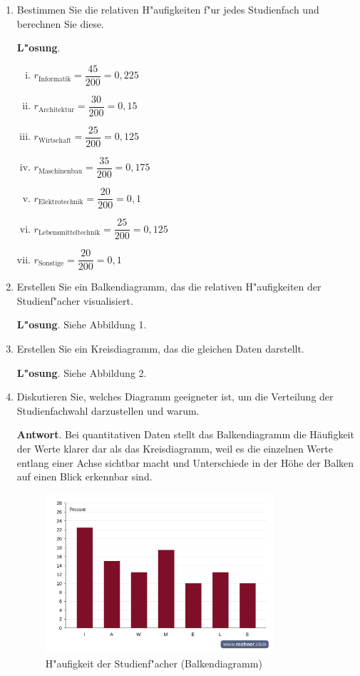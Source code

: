 \documentclass[10pt, a4paper, oneside]{article}
\begin{document}
\begin{enumerate}[1.]
    \item Bestimmen Sie die relativen H"aufigkeiten f"ur jedes Studienfach und
        berechnen Sie diese.

        \textbf{L"osung}.
        \begin{enumerate}[i)]
            \item $r_{\text{Informatik}} = \dfrac{45}{200} = 0,225$
            \item $r_{\text{Architektur}} = \dfrac{30}{200} = 0,15$
            \item $r_{\text{Wirtschaft}} = \dfrac{25}{200} = 0,125$
            \item $r_{\text{Maschinenbau}} = \dfrac{35}{200} = 0,175$
            \item $r_{\text{Elektrotechnik}} = \dfrac{20}{200} = 0,1$
            \item $r_{\text{Lebensmitteltechnik}} = \dfrac{25}{200} = 0,125$
            \item $r_{\text{Sonstige}} = \dfrac{20}{200} = 0,1$
        \end{enumerate}
    \vspace{10pt}
    \item Erstellen Sie ein Balkendiagramm, das die relativen H"aufigkeiten der
        Studienf"acher visualisiert.

        \textbf{L"osung}. Siehe Abbildung 1.

    \item Erstellen Sie ein Kreisdiagramm, das die gleichen Daten darstellt.

        \textbf{L"osung}. Siehe Abbildung 2.

    \item Diskutieren Sie, welches Diagramm geeigneter ist, um die Verteilung
        der Studienfachwahl darzustellen und warum.

        \textbf{Antwort}. Bei quantitativen Daten stellt das Balkendiagramm die
        Häufigkeit der Werte klarer dar als das Kreisdiagramm, weil es die
        einzelnen Werte entlang einer Achse sichtbar macht und Unterschiede in
        der Höhe der Balken auf einen Blick erkennbar sind.

    \pagebreak
    \begin{figure}[h]
        \centering
        \includegraphics[width=0.8\textwidth]{./assets/saeulendiagramm-01.png}
        \caption{H"aufigkeit der Studienf"acher (Balkendiagramm)}
    \end{figure}


\end{enumerate}
\end{document}
